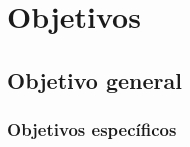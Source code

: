 \chapter{Objetivos}
\label{chap:objetivos}


\section{Objetivo general}


\subsection{Objetivos específicos}






